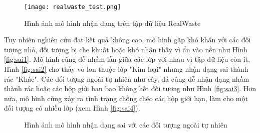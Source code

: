 \documentclass[../the.tex]{subfiles}
\begin{document}
\begin{figure}[H]
    \centering
    \texttt{[image: realwaste\_test.png]}
    \caption{Hình ảnh mô hình nhận dạng trên tập dữ liệu RealWaste}
    \label{fig:realwaste}
\end{figure}

{\fontsize{13}{12} \selectfont

Tuy nhiên nghiên cứu đạt kết quả không cao, mô hình gặp khó khăn với các đối tượng nhỏ, đối tượng bị che khuất hoặc khó nhận thấy vì ẩn vào nền như Hình \ref{fig:sai1}.
Mô hình cũng dễ nhầm lẫn giữa các lớp với nhau vì tập dữ liệu còn ít, Hình \ref{fig:sai2} cho thấy vỏ lon thuộc lớp "Kim loại" nhưng nhận dạng sai thành rác "Khác".
Các đối tượng ngoài tự nhiên như cây, đá cũng dễ nhận dạng nhầm thành rác hoặc các hộp giới hạn bao không hết đối tượng như Hình \ref{fig:sai3}.
Hơn nữa, mô hình cũng xảy ra tình trạng chồng chéo các hộp giới hạn, làm cho một đối tượng có nhiều lớp (xem Hình \ref{fig:sai4}).

}


\begin{figure}[H]
    \centering
    \qquad
    \qquad
    \qquad
    \caption{Hình ảnh mô hình nhận dạng sai với các đối tượng ngoài tự nhiên}
    \label{fig:sai}
\end{figure}
\end{document}

